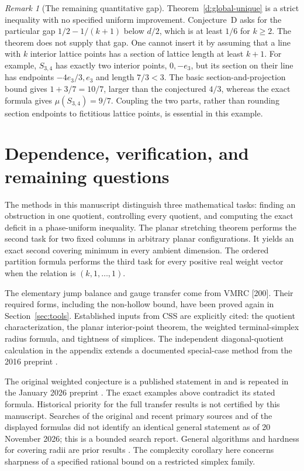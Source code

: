 \documentclass[11pt,a4paper]{article}
\theoremstyle{remark}\newtheorem{remark}[theorem]{Remark}
\begin{document}
\begin{remark}[The remaining quantitative gap]\label{d:remaining-gap}
Theorem~\ref{d:global-unique} is a strict inequality with no
specified uniform improvement. Conjecture~D asks for the particular
gap $1/2-1/(k+1)$ below $d/2$, which is at least $1/6$ for $k\ge2$.
The theorem does not supply that gap.
One cannot insert it by assuming that a line with $k$ interior
lattice points has a section of lattice length at least $k+1$.
For example, $S_{3,4}$ has exactly two interior points, $0,-e_3$,
but its section on their line has endpoints $-4e_3/3,e_3$ and
length $7/3<3$. The basic section-and-projection bound gives
$1+3/7=10/7$, larger than the conjectured $4/3$, whereas the exact
formula gives $\mu(S_{3,4})=9/7$. Coupling the two parts, rather
than rounding section endpoints to fictitious lattice points,
is essential in this example.
\end{remark}


\section{Dependence, verification, and remaining questions}
\label{sec:scope}
The methods in this manuscript distinguish three mathematical tasks:
finding an obstruction in one quotient, controlling every quotient,
and computing the exact deficit in a phase-uniform inequality.
The planar stretching theorem performs the second task for two fixed
columns in arbitrary planar configurations. It yields an exact
second covering minimum in every ambient dimension. The ordered
partition formula performs the third task for every positive real
weight vector when the relation is $(k,1,\ldots,1)$.

The elementary jump balance and gauge transfer come from VMRC [200].
Their required forms, including the non-hollow bound, have been
proved again in Section~\ref{sec:tools}. Established inputs from
CSS are explicitly cited: the quotient characterization, the planar
interior-point theorem, the weighted terminal-simplex radius formula,
and tightness of simplices. The independent diagonal-quotient
calculation in the appendix extends a documented special-case
method from the 2016 preprint \cite{GMS}.

The original weighted conjecture is a published statement in
\cite{CSS} and is repeated in the January 2026 preprint
\cite{Krivokuca}. The exact examples above contradict its stated
formula. Historical priority for the full transfer results is not
certified by this manuscript. Searches of the original and recent
primary sources and of the displayed formulas did not identify
an identical general statement as of 20 November 2026; this is a
bounded search report. General algorithms and hardness for covering
radii are prior results \cite{CGNS}. The complexity corollary here
concerns sharpness of a specified rational bound on a restricted
simplex family.
\end{document}
